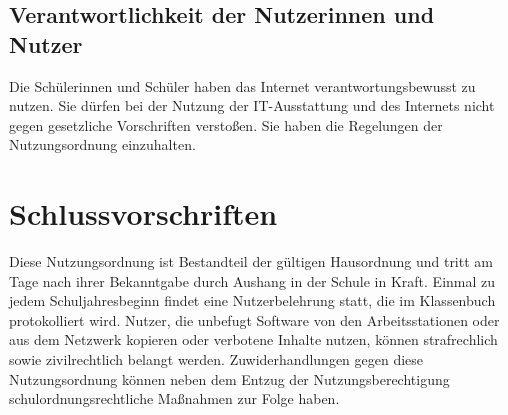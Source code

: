 \documentclass[a4paper, parskip]{scrartcl}
\begin{document}
\subsection{Verantwortlichkeit der Nutzerinnen und Nutzer}
Die Schülerinnen und Schüler haben das Internet verantwortungsbewusst zu
nutzen. Sie dürfen bei der Nutzung der IT-Ausstattung und des Internets nicht
gegen gesetzliche Vorschriften verstoßen. Sie haben die Regelungen der
Nutzungsordnung einzuhalten.

\section{Schlussvorschriften}
Diese Nutzungsordnung ist Bestandteil der gültigen Hausordnung und tritt am
Tage nach ihrer Bekanntgabe durch Aushang in der Schule in Kraft. Einmal zu
jedem Schuljahresbeginn findet eine Nutzerbelehrung statt, die im Klassenbuch
protokolliert wird. Nutzer, die unbefugt Software von den Arbeitsstationen oder
aus dem Netzwerk kopieren oder verbotene Inhalte nutzen, können strafrechlich
sowie zivilrechtlich belangt werden. Zuwiderhandlungen gegen diese
Nutzungsordnung können neben dem Entzug der Nutzungsberechtigung
schulordnungsrechtliche Maßnahmen zur Folge haben.
\end{document}
